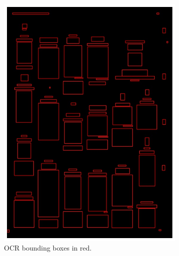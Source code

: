 \documentclass[oneside, english, bibtex]{kththesis}
\begin{document}
\begin{figure}[!htb]
\begin{adjustbox}{center,max size={\textwidth}{0.9\textheight}}
\parbox{1.5\textwidth}{\lineskip=0pt
\begin{subfigure}{0.75\textwidth}
  \centering
  \includegraphics[width=\linewidth, clip=true, trim = 0mm 0mm 0mm 0mm]{figures/ocr/GQU6vjW.jpg}
  \caption{OCR bounding boxes in red.}
  \label{fig:GQU6vjW_OCR_tf}
\end{subfigure}%
\begin{subfigure}{0.75\textwidth}
  \centering

\end{subfigure}}
\end{adjustbox}
\end{figure}
\end{document}
